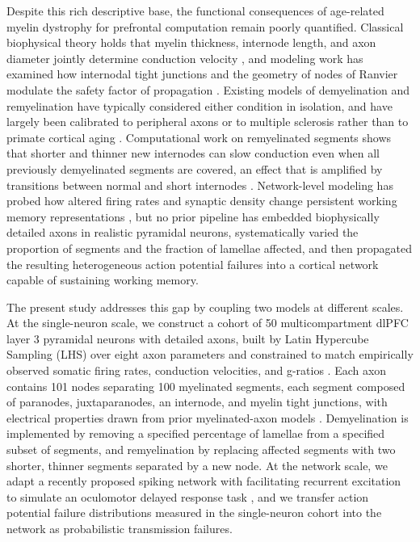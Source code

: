\documentclass[11pt]{article}
\begin{document}
Despite this rich descriptive base, the functional consequences of age-related myelin dystrophy for prefrontal computation remain poorly quantified. Classical biophysical theory holds that myelin thickness, internode length, and axon diameter jointly determine conduction velocity \citep{waxman1980determinants}, and modeling work has examined how internodal tight junctions and the geometry of nodes of Ranvier modulate the safety factor of propagation \citep{devaux2008tight,smith2024nodal}. Existing models of demyelination and remyelination have typically considered either condition in isolation, and have largely been calibrated to peripheral axons or to multiple sclerosis rather than to primate cortical aging \citep{stephanova2003extracellular,coggan2015demyelination,naud2019demyelination}. Computational work on remyelinated segments shows that shorter and thinner new internodes can slow conduction even when all previously demyelinated segments are covered, an effect that is amplified by transitions between normal and short internodes \citep{lasiene2008partial,powers2012remyelination,scurfield2018internodal}. Network-level modeling has probed how altered firing rates and synaptic density change persistent working memory representations \citep{compte2000synaptic,hansel2013short,ibanez2020network}, but no prior pipeline has embedded biophysically detailed axons in realistic pyramidal neurons, systematically varied the proportion of segments and the fraction of lamellae affected, and then propagated the resulting heterogeneous action potential failures into a cortical network capable of sustaining working memory.

The present study addresses this gap by coupling two models at different scales. At the single-neuron scale, we construct a cohort of 50 multicompartment dlPFC layer 3 pyramidal neurons with detailed axons, built by Latin Hypercube Sampling (LHS) over eight axon parameters and constrained to match empirically observed somatic firing rates, conduction velocities, and g-ratios \citep{rumbell2016automated,coskren2015aging}. Each axon contains 101 nodes separating 100 myelinated segments, each segment composed of paranodes, juxtaparanodes, an internode, and myelin tight junctions, with electrical properties drawn from prior myelinated-axon models \citep{devaux2008tight,scurfield2018internodal}. Demyelination is implemented by removing a specified percentage of lamellae from a specified subset of segments, and remyelination by replacing affected segments with two shorter, thinner segments separated by a new node. At the network scale, we adapt a recently proposed spiking network with facilitating recurrent excitation \citep{hansel2013short} to simulate an oculomotor delayed response task \citep{funahashi1989mnemonic}, and we transfer action potential failure distributions measured in the single-neuron cohort into the network as probabilistic transmission failures.
\end{document}
